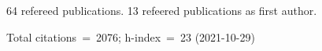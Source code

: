 64 refereed publications. 13 refeered publications as first author.

Total citations~=~2076; h-index~=~23 (2021-10-29)